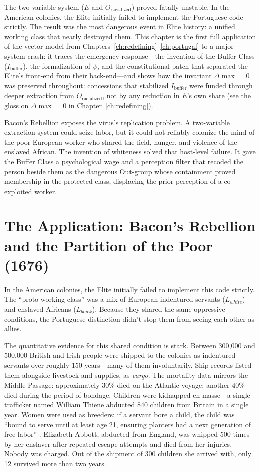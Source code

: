 The two-variable system ($E$ and $O_{\text{racialized}}$) proved fatally unstable. In the American colonies, the Elite initially failed to implement the Portuguese code strictly. The result was the most dangerous event in Elite history: a unified working class that nearly destroyed them. This chapter is the first full application of the vector model from Chapters~\ref{ch:redefining}--\ref{ch:portugal} to a major system crash: it traces the emergency response---the invention of the Buffer Class ($I_{\text{buffer}}$), the formalization of $\psi$, and the constitutional patch that separated the Elite's front-end from their back-end---and shows how the invariant $\Delta\max = 0$ was preserved throughout: concessions that stabilized $I_{\text{buffer}}$ were funded through deeper extraction from $O_{\text{racialized}}$, not by any reduction in $E$'s own share (see the gloss on $\Delta\max = 0$ in Chapter~\ref{ch:redefining}).

Bacon's Rebellion exposes the virus's replication problem. A two-variable extraction system could seize labor, but it could not reliably colonize the mind of the poor European worker who shared the field, hunger, and violence of the enslaved African. The invention of whiteness solved that host-level failure. It gave the Buffer Class a psychological wage and a perception filter that recoded the person beside them as the dangerous Out-group whose containment proved membership in the protected class, displacing the prior perception of a co-exploited worker.

\section{The Application: Bacon's Rebellion and the Partition of the Poor (1676)}
In the American colonies, the Elite initially failed to implement this code strictly. The ``proto-working class'' was a mix of European indentured servants ($L_{white}$) and enslaved Africans ($L_{black}$). Because they shared the same oppressive conditions, the Portuguese distinction didn't stop them from seeing each other as allies.

The quantitative evidence for this shared condition is stark. Between 300,000 and 500,000 British and Irish people were shipped to the colonies as indentured servants over roughly 150 years---many of them involuntarily. Ship records listed them alongside livestock and supplies, as \textit{cargo}. The mortality data mirrors the Middle Passage: approximately 30\% died on the Atlantic voyage; another 40\% died during the period of bondage. Children were kidnapped en masse---a single trafficker named William Thiene abducted 840 children from Britain in a single year. Women were used as breeders: if a servant bore a child, the child was ``bound to serve until at least age 21, ensuring planters had a next generation of free labor'' \cite{jordan2008}. Elizabeth Abbott, abducted from England, was whipped 500 times by her enslaver after repeated escape attempts and died from her injuries. Nobody was charged. Out of the shipment of 300 children she arrived with, only 12 survived more than two years.

